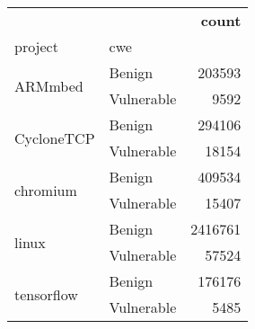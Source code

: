 \begin{tabular}{|l|l|r|}
 &  & \bfseries count \\
project & cwe &  \\
\multirow[c]{2}{*}{ARMmbed} & Benign & 203593 \\
 & Vulnerable & 9592 \\
\multirow[c]{2}{*}{CycloneTCP} & Benign & 294106 \\
 & Vulnerable & 18154 \\
\multirow[c]{2}{*}{chromium} & Benign & 409534 \\
 & Vulnerable & 15407 \\
\multirow[c]{2}{*}{linux} & Benign & 2416761 \\
 & Vulnerable & 57524 \\
\multirow[c]{2}{*}{tensorflow} & Benign & 176176 \\
 & Vulnerable & 5485 \\
\end{tabular}
